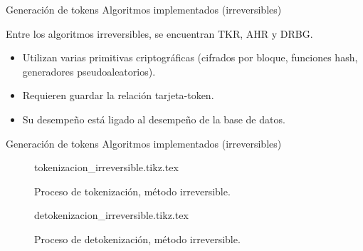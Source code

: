\begin{frame}{Generación de tokens}
{Algoritmos implementados (irreversibles)}

  Entre los algoritmos irreversibles, se encuentran TKR, AHR y DRBG.
  \begin{itemize}
    \item Utilizan varias primitivas criptográficas (cifrados por bloque,
      funciones hash, generadores pseudoaleatorios).
    \item Requieren guardar la relación tarjeta-token.
    \item Su desempeño está ligado al desempeño de la base de datos.
  \end{itemize}


\end{frame}

\begin{frame}{Generación de tokens}
  {Algoritmos implementados (irreversibles)}
  \begin{figure}
    \centering
    {tokenizacion_irreversible.tikz.tex}
    \caption{Proceso de tokenización, método irreversible.}
  \end{figure}

  \begin{figure}
    \centering
    {detokenizacion_irreversible.tikz.tex}
    \caption{Proceso de detokenización, método irreversible.}
  \end{figure}

\end{frame}
